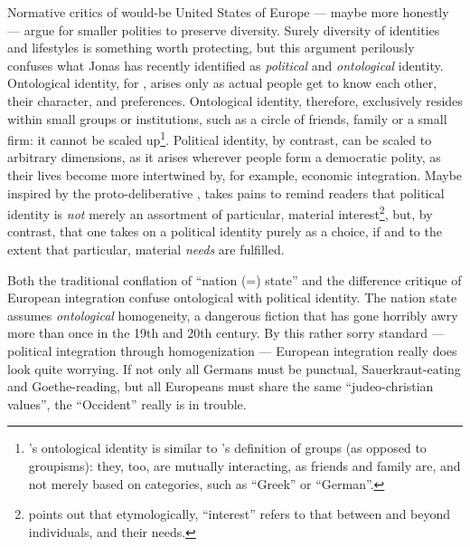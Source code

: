 Normative critics of would-be United States of Europe --- maybe more honestly --- argue for smaller polities to preserve diversity. Surely diversity of identities and lifestyles is something worth protecting, but this argument perilously confuses what Jonas \cite{Marx2012} has recently identified as \emph{political} and \emph{ontological} identity. Ontological identity, for \citeauthor{Marx2012}, arises only as actual people get to know each other, their character, and preferences. Ontological identity, therefore, exclusively resides within small groups or institutions, such as a circle of friends, family or a small firm: it cannot be scaled up\footnote{
	\cite{Marx2012}'s ontological identity is similar to \cite{Brubaker-2002-aa}'s definition of groups (as opposed to groupisms): they, too, are mutually interacting, as friends and family are, and not merely based on categories, such as ``Greek'' or ``German''.}.
Political identity, by contrast, can be scaled to arbitrary dimensions, as it arises wherever people form a democratic polity, as their lives become more intertwined by, for example, economic integration. Maybe inspired by the proto-deliberative \cite{Arendt1958}, \citeauthor{Marx2012} takes pains to remind readers that political identity is \emph{not} merely an assortment of particular, material interest\footnote{
	\citeauthor{Marx2012} points out that etymologically, ``interest'' refers to that between and beyond individuals, and their needs.},
but, by contrast, that one takes on a political identity purely as a choice, if and to the extent that particular, material \emph{needs} are fulfilled.

Both the traditional conflation of ``nation (=) state'' and the difference critique of European integration confuse ontological with political identity. The nation state assumes \emph{ontological} homogeneity, a dangerous fiction that has gone horribly awry more than once in the 19th and 20th century. By this rather sorry standard --- political integration through homogenization --- European integration really does look quite worrying. If not only all Germans must be punctual, Sauerkraut-eating and Goethe-reading, but all Europeans must share the same ``judeo-christian values'', the ``Occident'' really is in trouble.


